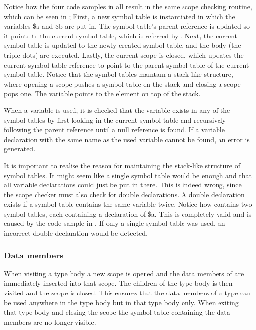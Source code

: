 Notice how the four code samples in  all result in the same
scope checking routine, which can be seen in ; First, a new
symbol table is instantiated in which the variables \$a and \$b are put in. The
symbol table's parent reference is updated so it points to the current symbol
table, which is referred by  . Next, the
current symbol table is updated to the newly created symbol table, and the body
(the triple dots) are executed. Lastly, the current scope is closed, which
updates the current symbol table reference to point to the parent symbol table
of the current symbol table.  Notice that the symbol tables maintain a
stack-like structure, where opening a scope pushes a symbol table on the stack
and closing a scope pops one. The variable 
 points to the element on top of the stack.

When a variable is used, it is checked that the variable exists in any of the
symbol tables by first looking in the current symbol table and recursively
following the parent reference until a null reference is found. If a variable
declaration with the same name as the used variable cannot be found, an error is
generated.


It is important to realise the reason for maintaining the stack-like structure
of symbol tables. It might seem like a single symbol table would be enough and
that all variable declarations could just be put in there. This is indeed wrong,
since the scope checker must also check for double declarations. A double
declaration exists if a symbol table contains the same variable twice. Notice
how  contains two symbol tables, each containing a
declaration of \$a. This is completely valid and is caused by the code sample in
. If only a single symbol table was used, an incorrect double
declaration would be detected.


\subsubsection{Data members}
When visiting a type body a new scope is opened and the data members of
  are immediately inserted into that
scope. The children of the type body is then visited and the scope is closed.
This ensures that the data members of a type can be used anywhere in the type
body but in that type body only. When exiting that type body and closing the
scope the symbol table containing the data members are no longer visible.

